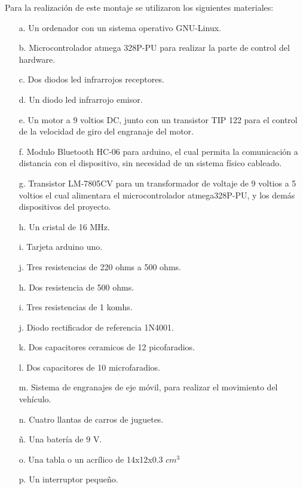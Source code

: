 \documentclass[12]{article}
\begin{document}
\begin{multicols}{2}
Para la realización de este montaje se utilizaron los siguientes materiales:
\begin{enumerate}
\item[a.] Un ordenador con un sistema operativo GNU-Linux.
\item[b.] Microcontrolador atmega 328P-PU \cite{ARDUINO} para realizar la parte de control del hardware.
\item[c.] Dos diodos led infrarrojos\cite{INFRARED} receptores.
\item[d.] Un diodo led infrarrojo\cite{INFRARED} emisor.
\item[e.] Un motor a 9 voltios DC, junto con un transistor TIP 122\cite{TIP122}   para el control de la velocidad de giro del engranaje del motor.
\item[f.] Modulo Bluetooth HC-06 para arduino, el cual permita la comunicación a distancia con el dispositivo, sin necesidad de un sistema físico cableado.
\item[g.] Transistor LM-7805CV \cite{REGULADOR} para un transformador de voltaje de 9 voltios a 5 voltios el cual alimentara el microcontrolador atmega328P-PU, y los demás dispositivos del proyecto.
\item[h.] Un cristal de 16 MHz.
\item[i.] Tarjeta arduino \cite{ARDUINO} uno.
\item[j.] Tres resistencias de 220 ohms a 500 ohms.
\item[h.] Dos resistencia de 500 ohms.
\item[i.] Tres resistencias de 1 komhs.
\item[j.] Diodo rectificador de referencia 1N4001. \cite{DIODO}
\item[k.] Dos capacitores ceramicos de 12 picofaradios.
\item[l.] Dos capacitores de 10 microfaradios.
\item[m.] Sistema de engranajes de eje móvil, para realizar el movimiento del vehículo.
\item[n.] Cuatro llantas de carros de juguetes.
\item[ñ.] Una batería de 9 V.
\item[o.] Una tabla o un acrílico de 14x12x0.3 $cm^{3}$
\item[p.] Un interruptor pequeño.
\end{enumerate}


\end{multicols}
\end{document}
